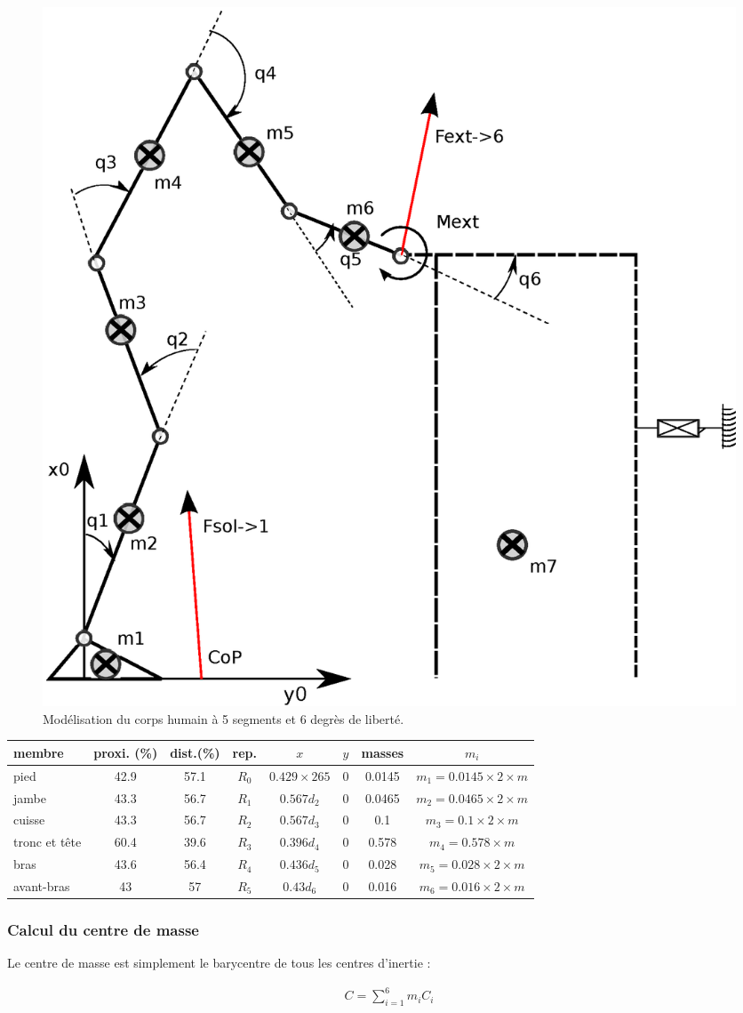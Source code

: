 \documentclass[a4paper, 10pt ]{article}
\begin{document}
\begin{figure}[h]
\centering
\includegraphics[width=0.5\columnwidth]{images/model/modeleHommeQ7.eps}
\caption{Modélisation du corps humain à 5 segments et 6 degrès de liberté. }
\label{fig:ModelHuman7forces}
\end{figure}

\begin{center}
\small{
\begin{tabular}{l |c |c| c| c| c| c|c}
membre & proxi. (\%)& dist.(\%) & rep. & $x$ & $y$ &  masses  & $m_i$\\
\hline
pied 	 			& 42.9 & 57.1 & $R_0$ & $ 0.429 \times 265 $		& 0 	& 0.0145 	&  $m_1=0.0145\times2\times m$\\
jambe 			& 43.3 & 56.7 & $R_1$ & $ 0.567 d_2$ 	& 0						& 0.0465 	&  $m_2= 0.0465\times2\times m$\\
cuisse 			& 43.3 & 56.7 & $R_2$ & $ 0.567 d_3$ 	& 0						& 0.1 			&   $m_3=0.1\times2\times m$\\
tronc et tête & 60.4 & 39.6 & $R_3$ & $ 0.396 d_4$ 	& 0						& 0.578 		&   $m_4=0.578\times m$\\
bras				& 43.6	& 56.4 & $R_4$ & $ 0.436 d_5$ 	& 0						& 0.028    	&  $m_5=0.028\times 2\times m$\\
avant-bras	& 43 	& 57		& $R_5$ & $0.43 d_6$		& 0						& 0.016 		& $m_6=0.016\times2\times m$
\end{tabular}}
\end{center}

\subsubsection{Calcul du centre de masse}

Le centre de masse est simplement le barycentre de tous les centres d'inertie :

\begin{align}
C=\sum_{i=1}^{6}{m_iC_i}
\end{align}
\end{document}
